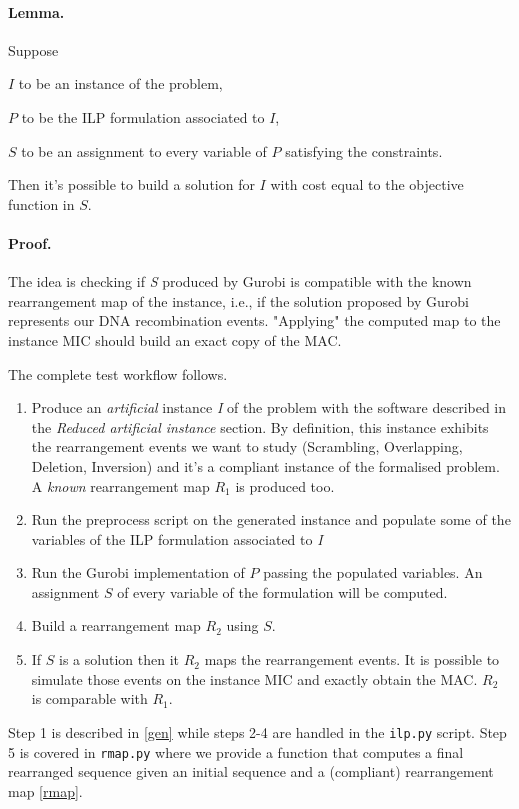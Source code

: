 \paragraph{Lemma.}
Suppose

$I$ to be an instance of the problem,

$P$ to be the ILP formulation associated to $I$,

$S$ to be an assignment to every variable of $P$ satisfying the constraints.

Then it's possible to build a solution for $I$ with cost equal to the objective function in $S$.

\paragraph{Proof.}
The idea is checking if \textit{S} produced by Gurobi is compatible with the known rearrangement map of the instance, i.e., if the solution proposed by Gurobi represents our DNA recombination events. "Applying" the computed map to the instance MIC should build an exact copy of the MAC.

The complete test workflow follows.

\begin{enumerate}
	\item Produce an \textit{artificial} instance \textit{I} of the problem with the software described in the \textit{Reduced artificial instance} section. By definition, this instance exhibits the rearrangement events we want to study (Scrambling, Overlapping, Deletion, Inversion) and it's a compliant instance of the formalised problem. A \textit{known} rearrangement map $R_1$ is produced too.
	\item Run the preprocess script on the generated instance and populate some of the variables of the ILP formulation associated to \textit{I}
	\item Run the Gurobi implementation of $P$ passing the populated variables. An assignment $S$ of every variable of the formulation will be computed.
	\item Build a rearrangement map $R_2$ using $S$.
	\item If $S$ is a solution then it $R_2$ maps the rearrangement events. It is possible to simulate those events on the instance MIC and exactly obtain the MAC. $R_2$ is comparable with $R_1$.
\end{enumerate}

Step 1 is described in \ref{gen} while steps 2-4 are handled in the \texttt{ilp.py} script. Step 5 is covered in \texttt{rmap.py} where we provide a function that computes a final rearranged sequence given an initial sequence and a (compliant) rearrangement map \ref{rmap}.


